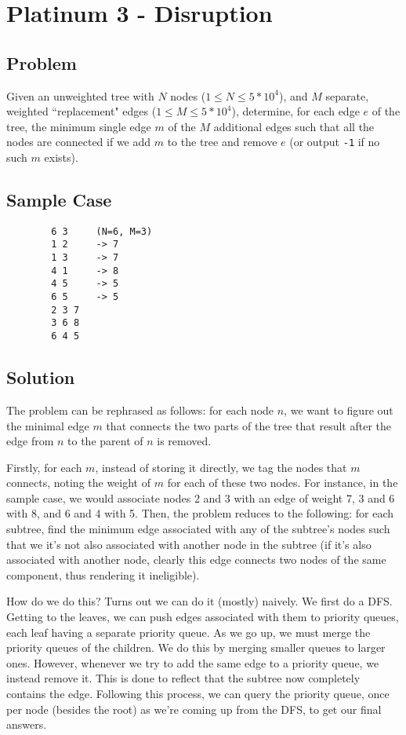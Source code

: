 \documentclass[11pt]{article}
\begin{document}
        
        
\section{Platinum 3 - Disruption}
    \subsection{Problem}
    Given an unweighted tree with $N$ nodes ($1 \leq N \leq 5*10^4$), and $M$ separate, weighted ``replacement" edges ($1 \leq M \leq 5*10^4$), determine, for each edge $e$ of the tree, the minimum single edge $m$ of the $M$ additional edges such that all the nodes are connected if we add $m$ to the tree and remove $e$ (or output \verb|-1| if no such $m$ exists).
    
    \subsection{Sample Case}
    \begin{verbatim}
        6 3     (N=6, M=3)
        1 2     -> 7
        1 3     -> 7
        4 1     -> 8
        4 5     -> 5
        6 5     -> 5
        2 3 7
        3 6 8
        6 4 5
    \end{verbatim}
    
    \subsection{Solution}
    The problem can be rephrased as follows: for each node $n$, we want to figure out the minimal edge $m$ that connects the two parts of the tree that result after the edge from $n$ to the parent of $n$ is removed.
    
    Firstly, for each $m$, instead of storing it directly, we tag the nodes that $m$ connects, noting the weight of $m$ for each of these two nodes. For instance, in the sample case, we would associate nodes 2 and 3 with an edge of weight 7, 3 and 6 with 8, and 6 and 4 with 5. Then, the problem reduces to the following: for each subtree, find the minimum edge associated with any of the subtree's nodes such that we it's not also associated with another node in the subtree (if it's also associated with another node, clearly this edge connects two nodes of the same component, thus rendering it ineligible).
    
    How do we do this? Turns out we can do it (mostly) naively. We first do a DFS. Getting to the leaves, we can push edges associated with them to priority queues, each leaf having a separate priority queue. As we go up, we must merge the priority queues of the children. We do this by merging smaller queues to larger ones. However, whenever we try to add the same edge to a priority queue, we instead remove it. This is done to reflect that the subtree now completely contains the edge. Following this process, we can query the priority queue, once per node (besides the root) as we're coming up from the DFS, to get our final answers.
    
\end{document}
